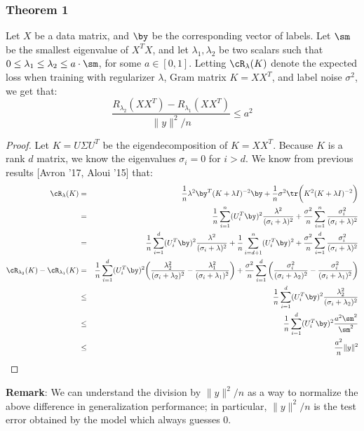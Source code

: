 \subsubsection{Theorem 1}
\begin{theorem}
Let $X$ be a data matrix, and $\by$ be the corresponding vector of labels. Let $\sm$ be the smallest eigenvalue of $X^T X$, and let $\lambda_1, \lambda_2$ be two scalars such that $0 \leq \lambda_1 \leq \lambda_2 \leq a\cdot \sm$, for some $a \in [0,1]$. Letting $\cR_{\lambda}(K)$ denote the expected loss when training with regularizer $\lambda$, Gram matrix $K = XX^T$, and label noise $\sigma^2$, we get that:
\begin{equation}
\frac{R_{\lambda_2}(XX^T) - R_{\lambda_1}(XX^T)}{\|y\|^2/n} \leq a^2
\label{eq1}
\end{equation}
\end{theorem}
\begin{proof}
Let $K = U\Sigma U^T$ be the eigendecomposition of $K = XX^T$. Because $K$ is a rank $d$ matrix, we know the eigenvalues $\sigma_i=0$ for $i > d$.  We know from previous results [Avron '17, Aloui '15] that:
\begin{eqnarray*}
\cR_{\lambda}(K) &=& \frac{1}{n}\lambda^2\by^T(K+\lambda I)^{-2} \by + \frac{1}{n}\sigma^2 \tr\bigg(K^2(K+\lambda I)^{-2}\bigg) \\
&=& \frac{1}{n}\sum_{i=1}^n (U_i^T \by)^2\frac{\lambda^2}{(\sigma_i + \lambda)^2} + \frac{\sigma^2}{n}\sum_{i=1}^n \frac{\sigma_i^2}{(\sigma_i + \lambda)^2} \\
&=& \frac{1}{n}\sum_{i=1}^d (U_i^T \by)^2\frac{\lambda^2}{(\sigma_i + \lambda)^2} +
\frac{1}{n}\sum_{i=d+1}^n (U_i^T \by)^2 +
 \frac{\sigma^2}{n}\sum_{i=1}^d \frac{\sigma_i^2}{(\sigma_i + \lambda)^2} \\
\cR_{\lambda_2}(K) - \cR_{\lambda_1}(K) 
&=& \frac{1}{n}\sum_{i=1}^d (U_i^T \by)^2\bigg(\frac{\lambda_2^2}{(\sigma_i + \lambda_2)^2} - \frac{\lambda_1^2}{(\sigma_i + \lambda_1)^2}\bigg) +
\frac{\sigma^2}{n}\sum_{i=1}^d \bigg(\frac{\sigma_i^2}{(\sigma_i + \lambda_2)^2} - \frac{\sigma_i^2}{(\sigma_i + \lambda_1)^2} \bigg)\\
&\leq& \frac{1}{n}\sum_{i=1}^d (U_i^T \by)^2\frac{\lambda_2^2}{(\sigma_i + \lambda_2)^2}\\
&\leq& \frac{1}{n}\sum_{i=1}^d (U_i^T \by)^2\frac{a^2 \sm^2}{\sm^2}\\
&\leq& \frac{a^2}{n}\|y\|^2
\end{eqnarray*}
\end{proof}
\textbf{Remark}: We can understand the division by $\|y\|^2/n$ as a way to normalize the above difference in generalization performance; in particular, $\|y\|^2/n$ is the test error obtained by the model which always guesses $0$.

